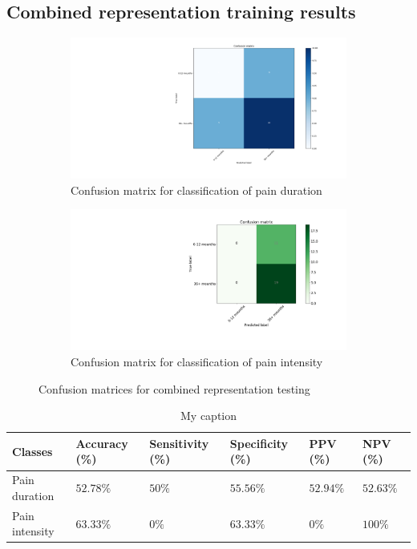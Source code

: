 \documentclass[12pt,a4paper]{article}
\begin{document}
\subsection{Combined representation training results}

\begin{figure}[H]
  \begin{subfigure}[b]{0.45\textwidth}
    \includegraphics[width=\textwidth]{figures/edura2cla}
    \caption{Confusion matrix for classification of pain duration}
    \label{fig:f1}
  \end{subfigure}
  \hfill
  \begin{subfigure}[b]{0.45\textwidth}
    \includegraphics[width=\textwidth]{figures/epain2cla}
    \caption{Confusion matrix for classification of pain intensity}
    \label{fig:f2}
  \end{subfigure}
  \caption{Confusion matrices for combined representation testing}
\end{figure}



\begin{table}[H]
\centering
\begin{tabular}{|p{2cm}|p{2.2cm}|p{2.2cm}|p{2.2cm}|p{2cm}|p{2cm}|}
\hline
Classes          & Accuracy (\%) & Sensitivity (\%) & Specificity (\%) & PPV (\%) & NPV (\%) \\ \hline
Pain duration &$52.78\%$&$50\%$&$55.56\%$&$52.94\%$&$52.63\%$ \\ \hline
Pain intensity &$63.33\%$&$0\%$&$63.33\%$&$0\%$&$100\%$ \\ \hline
\end{tabular}
\label{my-label}
\caption{My caption}
\end{table}
\end{document}
